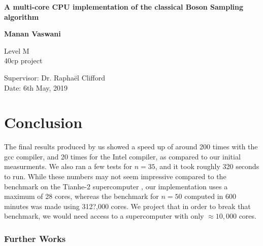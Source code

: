 \documentclass[11pt]{article}
\theoremstyle{theorem}
\theoremstyle{remark}
\theoremstyle{plain}
\theoremstyle{definition}
\begin{document}
\begin{titlepage}
    \begin{center}
        \vspace*{\fill}
        
        \Huge
        \textbf{A multi-core CPU implementation of the classical Boson Sampling algorithm}
        
        \LARGE
        
        \vspace{2cm}
        \textbf{Manan Vaswani}
        
        \vfill
        
        Level M\\
        40cp project
        
        \vspace{0.8cm}
        
        
        \Large
        Supervisor: Dr. Rapha\"el Clifford\\
	Date: 6th May, 2019
        
    \end{center}
\end{titlepage}

\newpage
\tableofcontents

\section{Conclusion}
The final results produced by us showed a speed up of around 200 times with the gcc compiler, and 20 times for the Intel compiler, as compared to our initial measurments. We also ran a few tests for $n=35$, and it took roughly 320 seconds to run. While these numbers may not seem impressive compared to the benchmark on the Tianhe-2 supercomputer \cite{wu2018}, our implementation uses a maximum of 28 cores, whereas the benchmark for $n=50$ computed in 600 minutes was made using 312?,000 cores. We project that in order to break that benchmark, we would need access to a supercomputer with only $\approx 10,000$ cores.
\subsubsection{Further Works}



\end{document}
